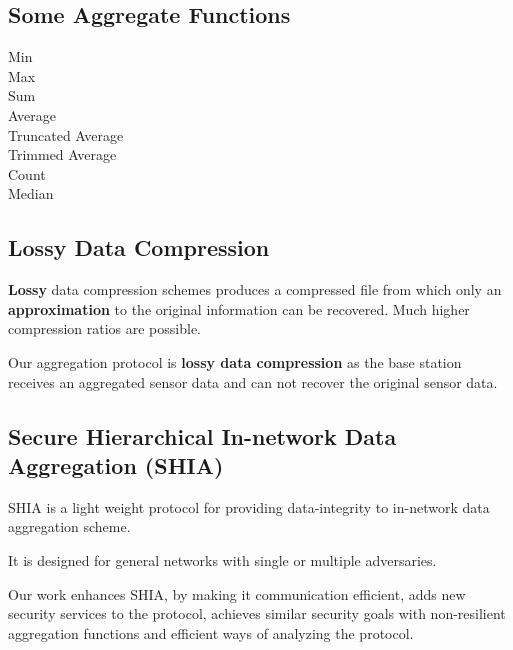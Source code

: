 \documentclass[%
  slidesonly,%
  semlayer%
  ]{seminar}                                  %
\begin{document}
\begin{slide}
  \subsection*{Some Aggregate Functions}
    \vspace{0.2in}
      \begin{description}
        \item[Min]
        \item[Max]
        \item[Sum]
        \item[Average]
        \item[Truncated Average]
        \item[Trimmed Average]
        \item[Count]
        \item[Median]
      \end{description}
    \vfill
    \clearpage

  \subsection*{Lossy Data Compression}
    \vspace{0.3in}
    \textbf{Lossy} data compression schemes produces a compressed file from which only an \textbf{approximation} to the original information can be recovered. Much higher compression ratios are possible.
    \vspace{0.3in}

    Our aggregation protocol is \textbf{lossy data compression} as the base station receives an aggregated sensor data and can not recover the original sensor data.
    \vfill
    \clearpage

\subsection*{Secure Hierarchical In-network Data Aggregation (SHIA)}
    \vspace{0.2in}
    SHIA is a light weight protocol for providing data-integrity to in-network data aggregation scheme.
    \vspace{0.1in}
    
    It is designed for general networks with single or multiple adversaries.
    \vspace{0.1in}    
    
    Our work enhances SHIA, by making it communication efficient, adds new security services to the protocol, achieves similar security goals with non-resilient aggregation functions and efficient ways of analyzing the protocol.
    \vfill
    \clearpage


\end{slide}
\end{document}
